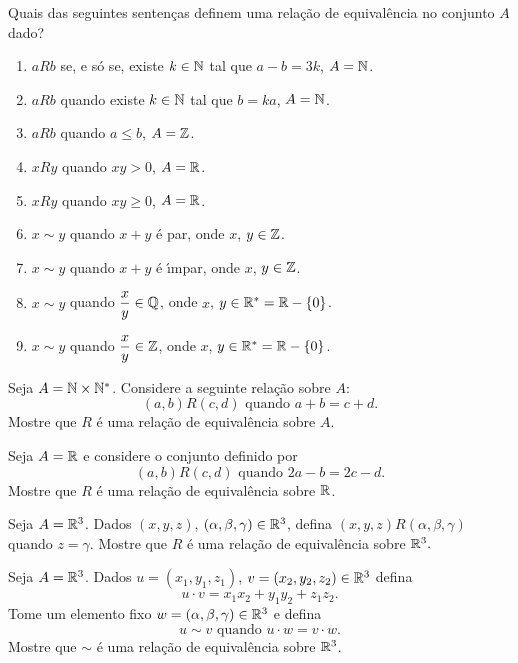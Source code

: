 \documentclass[12pt]{exam}
\begin{document}
\questao{} Quais das seguintes senten{\c c}as definem uma rela{\c c}{\~a}o de equival{\^e}ncia no conjunto $A$ dado?
\begin{enumerate}[label={\alph*})]
    \item $aRb$ se, e s{\'o} se, existe $k \in \mathbb{N}$ tal que $a - b = 3k$, $A = \mathbb{N}$.
    \item $aRb$ quando existe $k \in \mathbb{N}$ tal que $b = k a$, $A = \mathbb{N}$.
    \item $aRb$ quando $a \le b$, $A = \mathbb{Z}$.
    \item $xRy$ quando $xy > 0$, $ A = \mathbb{R}$.
    \item $xRy$ quando $xy \ge 0$, $ A = \mathbb{R}$.
    \item $x \sim y$ quando $x + y$ \'e par, onde $x$, $y \in \mathbb{Z}$.
    \item $x \sim y$ quando $x + y$ \'e {\'\i}mpar, onde $x$, $y \in \mathbb{Z}$.
    \item $x \sim y$ quando $\dfrac{x}{y} \in \mathbb{Q}$, onde $x$, $y \in \mathbb{R}^* = \mathbb{R} - \{0\}$.
    \item $x \sim y$ quando $\dfrac{x}{y} \in \mathbb{Z}$, onde $x$, $y \in \mathbb{R}^* = \mathbb{R} - \{0\}$.
\end{enumerate}

\vspace{.3cm}


\questao{} Seja $A = \mathbb{N} \times \mathbb{N}^*$. Considere a seguinte
rela{\c c}{\~a}o sobre $A$:
\[
    (a,b) R (c,d) \mbox{ quando } a + b = c + d.
\]
Mostre que $R$ {\'e} uma rela{\c c}{\~a}o de equival{\^e}ncia sobre $A$.

\vspace{.3cm}

\questao{} Seja $A = \mathbb{R}$ e considere o conjunto definido por
\[
  (a,b)R(c,d) \mbox{ quando } 2a - b = 2c - d.
\]
Mostre que $R$ \'e uma rela\c{c}\~ao de equival\^encia sobre $\mathbb{R}$.

\vspace{.3cm}

\questao{} Seja $A = \mathbb{R}^3$. Dados $(x, y, z)$, $(\alpha, \beta, \gamma) \in \mathbb{R}^3$, defina $(x, y, z) R (\alpha, \beta, \gamma)$ quando $z = \gamma$. Mostre que $R$ \'e uma rela\c{c}\~ao de equival\^encia sobre $\mathbb{R}^3.$

\vspace{.3cm}

\questao{} Seja $A = \mathbb{R}^3$. Dados $u = (x_1, y_1, z_1)$, $v = (x_2, y_2, z_2) \in \mathbb{R}^3$ defina
\[
    u\cdot v = x_1x_2 + y_1y_2 + z_1z_2.
\]
Tome um elemento fixo $w = (\alpha, \beta, \gamma) \in \mathbb{R}^3$ e defina
\[
    u \sim v \mbox{ quando } u \cdot w = v \cdot w.
\]
Mostre que $\sim$ \'e uma rela\c{c}\~ao de equival\^encia sobre $\mathbb{R}^3$.
\end{document}
